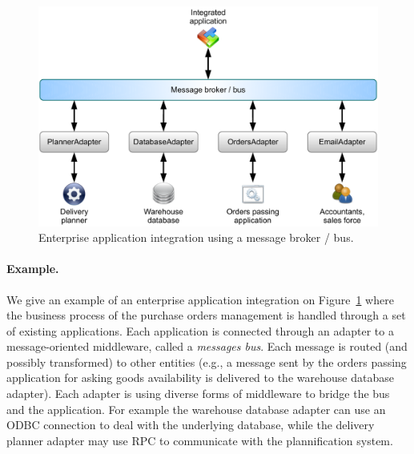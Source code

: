 \begin{figure}[htbp]
    \centering
    \includegraphics[width=\textwidth]{content/web-services/eai-scenario}
    \caption{Enterprise application integration using a message broker / bus.}
    \label{fig:eai-scenario}
\end{figure}

\paragraph{Example.}
We give an example of an enterprise application integration on Figure~\ref{fig:eai-scenario} where the business process of the purchase orders management is handled through a set of existing applications. Each application is connected through an adapter to a message-oriented middleware, called a \emph{messages bus}. Each message is routed (and possibly transformed) to other entities (e.g., a message sent by the orders passing application for asking goods availability is delivered to the warehouse database adapter). Each adapter is using diverse forms of middleware to bridge the bus and the application. For example the warehouse database adapter can use an ODBC connection to deal with the underlying database, while the delivery planner adapter may use RPC to communicate with the plannification system.

